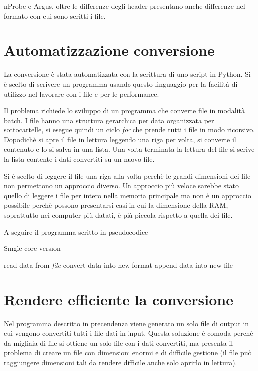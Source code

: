 \documentclass[../main.tex]{subfiles}
\begin{document}
nProbe e Argus, oltre le differenze degli header presentano anche differenze nel formato con cui sono scritti i file.



\section{Automatizzazione conversione}
La conversione è stata automatizzata con la scrittura di uno script in Python. Si è scelto di scrivere un programma usando questo linguaggio per la facilità di utilizzo nel lavorare con i file e per le performance.

Il problema richiede lo sviluppo di un programma che converte file in modalità batch.
I file hanno una struttura gerarchica per data organizzata per sottocartelle, si esegue quindi un ciclo \textit{for} che prende tutti i file in modo ricorsivo.
Dopodichè si apre il file in lettura leggendo una riga per volta, si converte il contenuto e lo si salva in una lista. Una volta terminata la lettura del file si scrive la lista contente i dati convertiti su un nuovo file.

Si è scelto di leggere il file una riga alla volta perchè le grandi dimensioni dei file non permettono un approccio diverso. Un approccio più veloce sarebbe stato quello di leggere i file per intero nella memoria principale ma non è un approccio possibile perchè possono presentarsi casi in cui la dimensione della RAM, soprattutto nei computer più datati, è più piccola rispetto a quella dei file.

A seguire il programma scritto in pseudocodice

\begin{algorithm}
\caption{Single core version}\label{single core version}
\begin{algorithmic}[1]
\State read data from \textit{file}
\State convert data into new format
\State append data into new file
\EndFor

\EndProcedure
\end{algorithmic}
\end{algorithm}

\section{Rendere efficiente la conversione}

Nel programma descritto in precendenza viene generato un solo file di output in cui vengono convertiti tutti i file dati in input. Questa soluzione è comoda perchè da migliaia di file si ottiene un solo file con i dati convertiti, ma presenta il problema di creare un file con dimensioni enormi e di difficile gestione (il file può raggiungere dimensioni tali da rendere difficile anche solo aprirlo in lettura).
\end{document}
